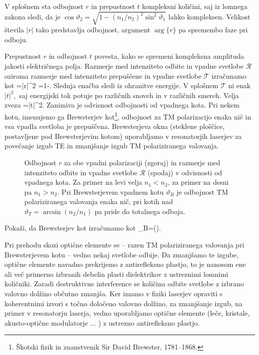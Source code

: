 V splošnem sta odbojnost $r$ in prepustnost $t$ kompleksni
količini, saj iz lomnega zakona sledi, da je $\cos\vartheta_{2}=
\sqrt{1-\left(n_{1}/n_{2}\right)^{2}\sin^{2}\vartheta_{1}}$
lahko kompleksen. Velikost števila $\left|r\right|$ tako predstavlja
odbojnost, argument $\arg\{r\}$ pa spremembo faze
pri odboju.

Prepustnost $r$ in odbojnost $t$ povesta, kako se spremeni kompleksna
amplituda jakosti električnega polja. Razmerje med intenziteto odbite
in vpadne svetlobe $\mathcal{R}$ oziroma razmerje med intenziteto prepuščene in vpadne svetlobe
$\mathcal{T}$ izračunamo kot 
\beq
{}=\left|r\right|^{2} \qquad {} \qquad {}=1-.
\eeq
Slednja enačba sledi iz ohranitve energije. V splošnem $\mathcal{T}$
ni enak $\left|t\right|^{2},$ saj energijski tok potuje po različnih
snoveh in v različnih smereh. Velja zveza
\beq
{}=\left|t\right|^{2}.
\eeq
Zanimiva je odvisnost odbojnosti od vpadnega kota. Pri nekem kotu, 
imenujemo ga Brewsterjev kot\footnote{Škotski fizik in znanstvenik Sir David Brewster, 1781--1868.}, 
odbojnost za TM polarizacijo enaka nič in vsa vpadla
svetloba je prepuščena. Brewsterjeva
okna (steklene ploščice, postavljene pod Brewsterjevim kotom) uporabljamo
v resonatorjih laserjev za povečanje izgub TE in zmanjšanje izgub
TM polariziranega valovanja.
\begin{figure}[h]
\centering
  \def\svgwidth{140truemm} 
  
\caption{Odbojnost $r$ za obe vpadni polarizaciji (zgoraj) in razmerje med intenziteto odbite
in vpadne svetlobe $\mathcal{R}$ (spodaj) v odvisnosti od vpadnega kota. Za primer na levi velja
$n_1<n_2$, za primer na desni pa $n_1>n_2$. Pri Brewsterjevem vpadnem 
kotu $\vartheta_B$ je odbojnost TM polariziranega valovanja enaka nič, pri kotih nad 
$\vartheta_T = \arcsin(n_2/n_1)$ pa pride do totalnega odboja.}
\label{fig:Brewster}
\end{figure}

\begin{definition}
Pokaži, da Brewsterjev kot izračunamo kot 
\beq
\vartheta_{B}=\arctan\left(\right).
\eeq
\end{definition}

\begin{remark}
Pri prehodu skozi optične elemente se --
razen TM polariziranega valovanja pri Brewsterjevem 
kotu -- vedno nekaj
svetlobe odbije. Da zmanjšamo te izgube, optične elemente navadno
prekrijemo z antirefleksno plastjo, to je nanosom ene ali več primerno
izbranih debelin plasti dielektrikov z ustreznimi lomnimi količniki.
Zaradi destruktivne interference se količina odbite svetlobe z izbrano
valovno dolžino občutno zmanjša. Ker imamo v fiziki laserjev opraviti
s koherentnimi izvori s točno določeno valovno dolžino, za zmanjšanje
izgub, na primer v resonatorju laserja, vedno uporabljamo optične
elemente (leče, kristale, akusto-optične modulatorje ... ) z ustrezno
antirefleksno plastjo.
\end{remark}

